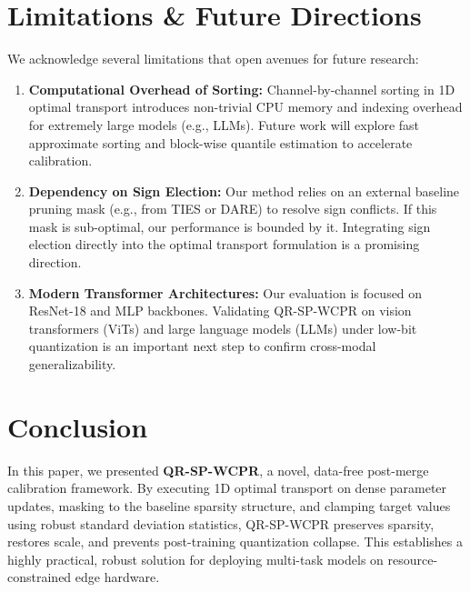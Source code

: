 \documentclass{article}
\theoremstyle{plain}
\theoremstyle{definition}
\theoremstyle{remark}
\begin{document}
\section{Limitations \& Future Directions}
\label{sec:limitations}
We acknowledge several limitations that open avenues for future research:
\begin{enumerate}
    \item \textbf{Computational Overhead of Sorting:} Channel-by-channel sorting in 1D optimal transport introduces non-trivial CPU memory and indexing overhead for extremely large models (e.g., LLMs). Future work will explore fast approximate sorting and block-wise quantile estimation to accelerate calibration.
    \item \textbf{Dependency on Sign Election:} Our method relies on an external baseline pruning mask (e.g., from TIES or DARE) to resolve sign conflicts. If this mask is sub-optimal, our performance is bounded by it. Integrating sign election directly into the optimal transport formulation is a promising direction.
    \item \textbf{Modern Transformer Architectures:} Our evaluation is focused on ResNet-18 and MLP backbones. Validating QR-SP-WCPR on vision transformers (ViTs) and large language models (LLMs) under low-bit quantization is an important next step to confirm cross-modal generalizability.
\end{enumerate}

\section{Conclusion}
In this paper, we presented \textbf{QR-SP-WCPR}, a novel, data-free post-merge calibration framework. By executing 1D optimal transport on dense parameter updates, masking to the baseline sparsity structure, and clamping target values using robust standard deviation statistics, QR-SP-WCPR preserves sparsity, restores scale, and prevents post-training quantization collapse. This establishes a highly practical, robust solution for deploying multi-task models on resource-constrained edge hardware.
\end{document}
